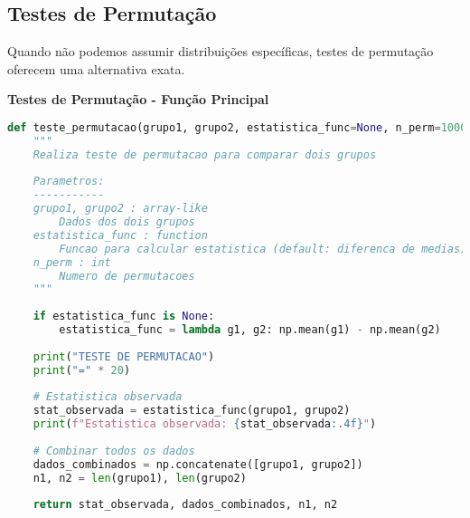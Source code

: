 \subsection{Testes de Permutação}

Quando não podemos assumir distribuições específicas, testes de permutação oferecem uma alternativa exata.

\begin{examplebox}
\textbf{Testes de Permutação - Função Principal}

\begin{lstlisting}[language=Python]
def teste_permutacao(grupo1, grupo2, estatistica_func=None, n_perm=10000):
    """
    Realiza teste de permutacao para comparar dois grupos
    
    Parametros:
    -----------
    grupo1, grupo2 : array-like
        Dados dos dois grupos
    estatistica_func : function
        Funcao para calcular estatistica (default: diferenca de medias)
    n_perm : int
        Numero de permutacoes
    """
    
    if estatistica_func is None:
        estatistica_func = lambda g1, g2: np.mean(g1) - np.mean(g2)
    
    print("TESTE DE PERMUTACAO")
    print("=" * 20)
    
    # Estatistica observada
    stat_observada = estatistica_func(grupo1, grupo2)
    print(f"Estatistica observada: {stat_observada:.4f}")
    
    # Combinar todos os dados
    dados_combinados = np.concatenate([grupo1, grupo2])
    n1, n2 = len(grupo1), len(grupo2)
    
    return stat_observada, dados_combinados, n1, n2
\end{lstlisting}
\end{examplebox}

